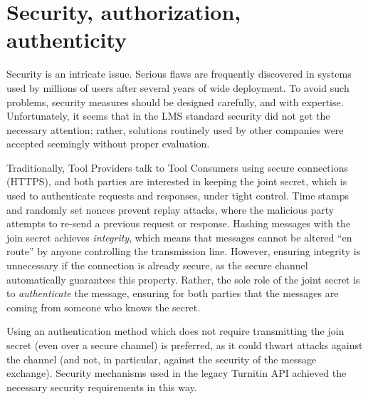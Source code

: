 \documentclass{article}
\begin{document}
\section{Security, authorization, authenticity}\label{sec:security}
Security is an intricate issue. Serious flaws are frequently discovered in systems used
by millions of users after several years of wide deployment. To avoid such problems, security
measures should be designed carefully, and with expertise. Unfortunately, it seems that in the
LMS standard security did not get the necessary attention; rather,
solutions routinely used by other companies were accepted seemingly without proper evaluation.

Traditionally, Tool Providers talk to Tool Consumers using secure connections
(HTTPS), and both parties are interested in keeping the joint secret,
which is used to authenticate requests and responses, under tight control.
Time stamps and randomly
set nonces prevent replay attacks, where the malicious party attempts to
re-send a previous request or response. Hashing messages with the join secret
achieves {\it integrity}, which means that messages cannot be altered
``en route'' by anyone controlling the transmission line. However, ensuring integrity
is unnecessary if the connection is already secure, as the
secure channel automatically guarantees this property. Rather, the sole role 
of the joint secret is to {\it authenticate} the message, ensuring for both 
parties that the messages are coming from someone who knows the secret.

Using an authentication method which does not require transmitting the join
secret (even over a secure channel) is preferred, as it could thwart attacks
against the channel (and not, in particular, against the security
of the message exchange). Security mechanisms used in the legacy Turnitin
API achieved the necessary security requirements in this way.
\end{document}
